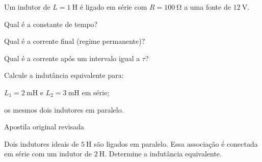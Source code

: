 \blocoaplicacao
\begin{questao}[2]{}

Um indutor de $L = \SI{1}{\henry}$ é ligado em série com $R = \SI{100}{\ohm}$ a
uma fonte de $\SI{12}{\volt}$.
\begin{itensq}
\item Qual é a constante de tempo?
\item Qual é a corrente final (regime permanente)?
\item Qual é a corrente após um intervalo igual a $\tau$?
\end{itensq}


\end{questao}
\begin{questao}[2]{}

Calcule a indutância equivalente para:
\begin{itensq}
\item $L_1 = \SI{2}{\milli\henry}$ e $L_2 = \SI{3}{\milli\henry}$ em série;
\item os mesmos dois indutores em paralelo.
\end{itensq}


\end{questao}
\begin{questao}[2]{Apostila original revisada}

Dois indutores ideais de $\SI{5}{\henry}$ são ligados em paralelo. Essa associação
é conectada em série com um indutor de $\SI{2}{\henry}$. Determine a indutância
equivalente.


\end{questao}


